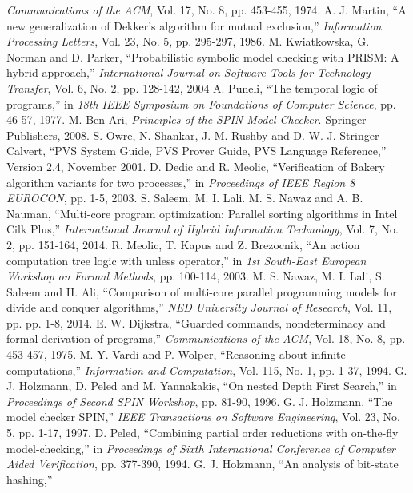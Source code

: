 \documentclass[conference]{IEEEtran}
\begin{document}
\begin{thebibliography}{50}
\emph{Communications of the ACM}, Vol. 17, No. 8, pp. 453-455, 1974.   
 A. J. Martin, ``A new generalization of Dekker's algorithm for mutual exclusion,'' 
\emph{Information Processing Letters}, Vol. 23, No. 5, pp. 295-297, 1986. 
 M. Kwiatkowska, G. Norman and D. Parker, ``Probabilistic symbolic model checking with PRISM: A hybrid approach,'' 
\emph{International Journal on Software Tools for Technology Transfer}, Vol. 6, No. 2, pp. 128-142, 2004
 A. Puneli, ``The temporal logic of programs,'' in \emph{18th IEEE Symposium on Foundations of Computer Science}, pp. 46-57, 1977. 
 M. Ben-Ari, \emph{Principles of the SPIN Model Checker}. Springer Publishers, 2008.
 S. Owre, N. Shankar, J. M. Rushby and D. W. J. Stringer-Calvert, ``PVS System Guide, PVS Prover Guide, PVS Language Reference,''
Version 2.4, November 2001.
 D. Dedic and R. Meolic, ``Verification of Bakery algorithm variants for two processes,''
in \emph{Proceedings of IEEE Region 8 EUROCON}, pp. 1-5, 2003.
 S. Saleem, M. I. Lali. M. S. Nawaz and A. B. Nauman, ``Multi-core program optimization: Parallel sorting algorithms in Intel Cilk Plus,''
\emph{International Journal of Hybrid Information Technology}, Vol. 7, No. 2, pp. 151-164, 2014.
 R. Meolic, T. Kapus and Z. Brezocnik, ``An action computation tree logic with unless operator,'' 
in \emph{1st South-East European Workshop on Formal  Methods}, pp. 100-114, 2003.
 M. S. Nawaz, M. I. Lali, S. Saleem and H. Ali, ``Comparison of multi-core parallel programming models for divide and conquer algorithms,''
\emph{NED University Journal of Research}, Vol. 11, pp. pp. 1-8, 2014.
 E. W. Dijkstra, ``Guarded commands, nondeterminacy and formal derivation of programs,''
\emph{Communications of the ACM}, Vol. 18, No. 8, pp. 453-457, 1975.
 M. Y. Vardi and P. Wolper, ``Reasoning about infinite computations,''
\emph{Information and Computation}, Vol. 115, No. 1, pp. 1-37, 1994.
 G. J. Holzmann, D. Peled and M. Yannakakis, ``On nested Depth First Search,'' 
in \emph{Proceedings of Second SPIN Workshop}, pp. 81-90, 1996.
 G. J. Holzmann, ``The model checker SPIN,'' \emph{IEEE Transactions on Software Engineering}, Vol. 23, No. 5, pp. 1-17, 1997.
 D. Peled, ``Combining partial order reductions with on-the-fly model-checking,'' 
in \emph{Proceedings of Sixth International Conference of Computer Aided Verification}, pp. 377-390, 1994.
 G. J. Holzmann, ``An analysis of bit-state hashing,'' 

\end{thebibliography}
\end{document}
